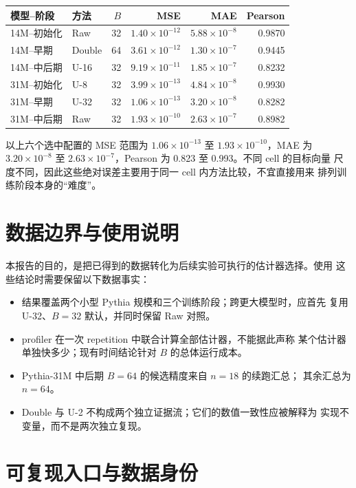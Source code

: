 \documentclass[11pt,a4paper]{ctexart}
\begin{document}
\begin{center}
\begin{tabular}{llrrrr}
  \toprule
  模型--阶段 & 方法 & $B$ & MSE & MAE & Pearson \\
  \midrule
  14M--初始化 & Raw & 32 & $1.40\times10^{-12}$ & $5.88\times10^{-8}$ & 0.9870 \\
  14M--早期 & Double & 64 & $3.61\times10^{-12}$ & $1.30\times10^{-7}$ & 0.9445 \\
  14M--中后期 & U-16 & 32 & $9.19\times10^{-11}$ & $1.85\times10^{-7}$ & 0.8232 \\
  31M--初始化 & U-8 & 32 & $3.99\times10^{-13}$ & $4.84\times10^{-8}$ & 0.9930 \\
  31M--早期 & U-32 & 32 & $1.06\times10^{-13}$ & $3.20\times10^{-8}$ & 0.8282 \\
  31M--中后期 & Raw & 32 & $1.93\times10^{-10}$ & $2.63\times10^{-7}$ & 0.8982 \\
  \bottomrule
\end{tabular}
\end{center}

以上六个选中配置的 MSE 范围为 $1.06\times10^{-13}$ 至
$1.93\times10^{-10}$，MAE 为 $3.20\times10^{-8}$ 至
$2.63\times10^{-7}$，Pearson 为 0.823 至 0.993。不同 cell 的目标向量
尺度不同，因此这些绝对误差主要用于同一 cell 内方法比较，不宜直接用来
排列训练阶段本身的“难度”。

\section{数据边界与使用说明}

本报告的目的，是把已得到的数据转化为后续实验可执行的估计器选择。使用
这些结论时需要保留以下数据事实：

\begin{itemize}
  \item 结果覆盖两个小型 Pythia 规模和三个训练阶段；跨更大模型时，应首先
    复用 U-32、$B=32$ 默认，并同时保留 Raw 对照。
  \item profiler 在一次 repetition 中联合计算全部估计器，不能据此声称
    某个估计器单独快多少；现有时间结论针对 $B$ 的总体运行成本。
  \item Pythia-31M 中后期 $B=64$ 的候选精度来自 $n=18$ 的续跑汇总；
    其余汇总为 $n=64$。
  \item Double 与 U-2 不构成两个独立证据流；它们的数值一致性应被解释为
    实现不变量，而不是两次独立复现。
\end{itemize}

\section{可复现入口与数据身份}
\end{document}
